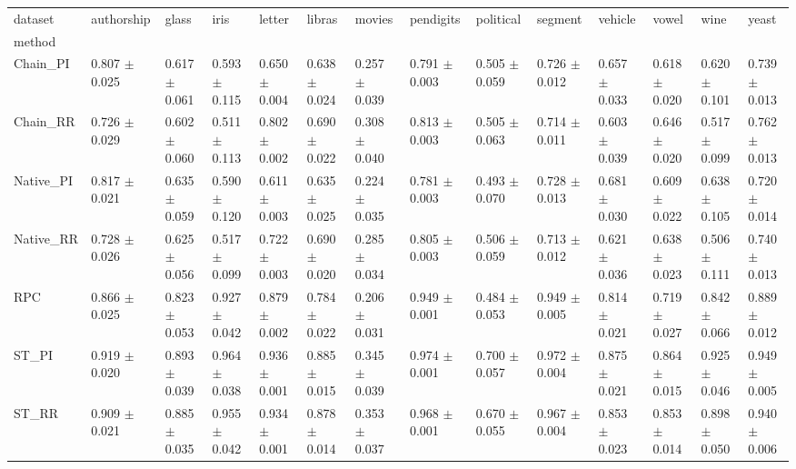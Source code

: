 \begin{tabular}{llllllllllllll}
\toprule
dataset &           authorship &                glass &                 iris &               letter &               libras &               movies &            pendigits &            political &              segment &              vehicle &                vowel &                 wine &                yeast \\
method    &                      &                      &                      &                      &                      &                      &                      &                      &                      &                      &                      &                      &                      \\
\midrule
Chain_PI  &  0.807 $ \pm $ 0.025 &  0.617 $ \pm $ 0.061 &  0.593 $ \pm $ 0.115 &  0.650 $ \pm $ 0.004 &  0.638 $ \pm $ 0.024 &  0.257 $ \pm $ 0.039 &  0.791 $ \pm $ 0.003 &  0.505 $ \pm $ 0.059 &  0.726 $ \pm $ 0.012 &  0.657 $ \pm $ 0.033 &  0.618 $ \pm $ 0.020 &  0.620 $ \pm $ 0.101 &  0.739 $ \pm $ 0.013 \\
Chain_RR  &  0.726 $ \pm $ 0.029 &  0.602 $ \pm $ 0.060 &  0.511 $ \pm $ 0.113 &  0.802 $ \pm $ 0.002 &  0.690 $ \pm $ 0.022 &  0.308 $ \pm $ 0.040 &  0.813 $ \pm $ 0.003 &  0.505 $ \pm $ 0.063 &  0.714 $ \pm $ 0.011 &  0.603 $ \pm $ 0.039 &  0.646 $ \pm $ 0.020 &  0.517 $ \pm $ 0.099 &  0.762 $ \pm $ 0.013 \\
Native_PI &  0.817 $ \pm $ 0.021 &  0.635 $ \pm $ 0.059 &  0.590 $ \pm $ 0.120 &  0.611 $ \pm $ 0.003 &  0.635 $ \pm $ 0.025 &  0.224 $ \pm $ 0.035 &  0.781 $ \pm $ 0.003 &  0.493 $ \pm $ 0.070 &  0.728 $ \pm $ 0.013 &  0.681 $ \pm $ 0.030 &  0.609 $ \pm $ 0.022 &  0.638 $ \pm $ 0.105 &  0.720 $ \pm $ 0.014 \\
Native_RR &  0.728 $ \pm $ 0.026 &  0.625 $ \pm $ 0.056 &  0.517 $ \pm $ 0.099 &  0.722 $ \pm $ 0.003 &  0.690 $ \pm $ 0.020 &  0.285 $ \pm $ 0.034 &  0.805 $ \pm $ 0.003 &  0.506 $ \pm $ 0.059 &  0.713 $ \pm $ 0.012 &  0.621 $ \pm $ 0.036 &  0.638 $ \pm $ 0.023 &  0.506 $ \pm $ 0.111 &  0.740 $ \pm $ 0.013 \\
RPC       &  0.866 $ \pm $ 0.025 &  0.823 $ \pm $ 0.053 &  0.927 $ \pm $ 0.042 &  0.879 $ \pm $ 0.002 &  0.784 $ \pm $ 0.022 &  0.206 $ \pm $ 0.031 &  0.949 $ \pm $ 0.001 &  0.484 $ \pm $ 0.053 &  0.949 $ \pm $ 0.005 &  0.814 $ \pm $ 0.021 &  0.719 $ \pm $ 0.027 &  0.842 $ \pm $ 0.066 &  0.889 $ \pm $ 0.012 \\
ST_PI     &  0.919 $ \pm $ 0.020 &  0.893 $ \pm $ 0.039 &  0.964 $ \pm $ 0.038 &  0.936 $ \pm $ 0.001 &  0.885 $ \pm $ 0.015 &  0.345 $ \pm $ 0.039 &  0.974 $ \pm $ 0.001 &  0.700 $ \pm $ 0.057 &  0.972 $ \pm $ 0.004 &  0.875 $ \pm $ 0.021 &  0.864 $ \pm $ 0.015 &  0.925 $ \pm $ 0.046 &  0.949 $ \pm $ 0.005 \\
ST_RR     &  0.909 $ \pm $ 0.021 &  0.885 $ \pm $ 0.035 &  0.955 $ \pm $ 0.042 &  0.934 $ \pm $ 0.001 &  0.878 $ \pm $ 0.014 &  0.353 $ \pm $ 0.037 &  0.968 $ \pm $ 0.001 &  0.670 $ \pm $ 0.055 &  0.967 $ \pm $ 0.004 &  0.853 $ \pm $ 0.023 &  0.853 $ \pm $ 0.014 &  0.898 $ \pm $ 0.050 &  0.940 $ \pm $ 0.006 \\
\bottomrule
\end{tabular}
